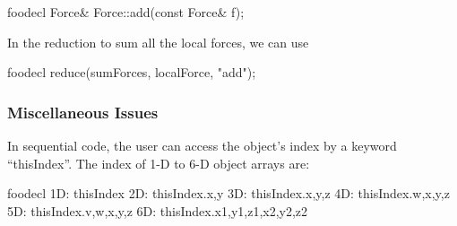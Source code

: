 \begin{SaveVerbatim}{foodecl}
    Force& Force::add(const Force& f);
\end{SaveVerbatim}

In the reduction to sum all the local forces, we can use

\begin{SaveVerbatim}{foodecl}
    reduce(sumForces, localForce, "add");
\end{SaveVerbatim}

\subsubsection{Miscellaneous Issues}
In sequential code, the user can access the object's index by a keyword 
``thisIndex''. The index of 1-D to 6-D object arrays are:

\begin{SaveVerbatim}{foodecl}
  1D: thisIndex
  2D: thisIndex.{x,y}
  3D: thisIndex.{x,y,z}
  4D: thisIndex.{w,x,y,z}
  5D: thisIndex.{v,w,x,y,z}
  6D: thisIndex.{x1,y1,z1,x2,y2,z2}
\end{SaveVerbatim}

